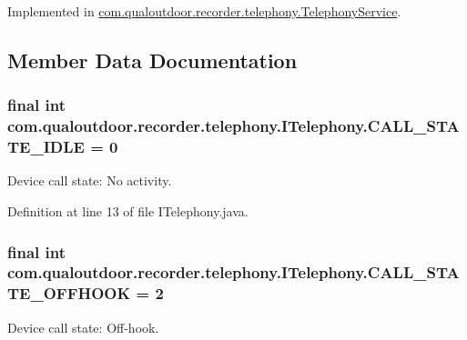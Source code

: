 Implemented in \hyperlink{classcom_1_1qualoutdoor_1_1recorder_1_1telephony_1_1TelephonyService_a8c2446484f717c321902b171161b3dbf}{com.\-qualoutdoor.\-recorder.\-telephony.\-Telephony\-Service}.



\subsection{Member Data Documentation}
\hypertarget{interfacecom_1_1qualoutdoor_1_1recorder_1_1telephony_1_1ITelephony_ab2d6e4c2dd160412dda46b26763e8a64}{
\subsubsection[{C\-A\-L\-L\-\_\-\-S\-T\-A\-T\-E\-\_\-\-I\-D\-L\-E}]{\setlength{\rightskip}{0pt plus 5cm}final int com.\-qualoutdoor.\-recorder.\-telephony.\-I\-Telephony.\-C\-A\-L\-L\-\_\-\-S\-T\-A\-T\-E\-\_\-\-I\-D\-L\-E = 0\hspace{0.3cm}{\ttfamily [static]}}}\label{interfacecom_1_1qualoutdoor_1_1recorder_1_1telephony_1_1ITelephony_ab2d6e4c2dd160412dda46b26763e8a64}
Device call state\-: No activity. 

Definition at line 13 of file I\-Telephony.\-java.

\hypertarget{interfacecom_1_1qualoutdoor_1_1recorder_1_1telephony_1_1ITelephony_a2efb64f0209a5ae97c7cb331827c80a9}{
\subsubsection[{C\-A\-L\-L\-\_\-\-S\-T\-A\-T\-E\-\_\-\-O\-F\-F\-H\-O\-O\-K}]{\setlength{\rightskip}{0pt plus 5cm}final int com.\-qualoutdoor.\-recorder.\-telephony.\-I\-Telephony.\-C\-A\-L\-L\-\_\-\-S\-T\-A\-T\-E\-\_\-\-O\-F\-F\-H\-O\-O\-K = 2\hspace{0.3cm}{\ttfamily [static]}}}\label{interfacecom_1_1qualoutdoor_1_1recorder_1_1telephony_1_1ITelephony_a2efb64f0209a5ae97c7cb331827c80a9}
Device call state\-: Off-\/hook. 

